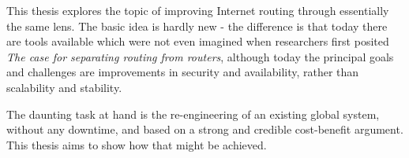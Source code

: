 This thesis explores the topic of improving Internet routing through essentially the same lens.  The basic idea is hardly new - the difference is that today there are tools available which were not even imagined when researchers first posited \emph{The case for separating routing from routers}\cite{Feamster2004}, although today the principal goals and challenges are improvements in security and availability, rather than scalability and stability.


The daunting task at hand is the re-engineering of an existing global system, without any downtime, and based on a strong and credible cost-benefit argument.
This thesis aims to show how that might be achieved.
